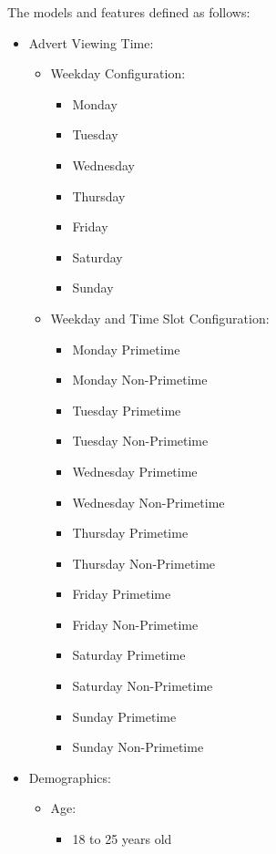 \documentclass[review]{elsarticle}
\begin{document}
The models and features defined as follows:

\begin{itemize}
    \item{Advert Viewing Time:}
    \begin{itemize}
        \item Weekday Configuration:
        \begin{itemize}
            \item Monday
            \item Tuesday
            \item Wednesday
            \item Thursday
            \item Friday
            \item Saturday
            \item Sunday
        \end{itemize}
        \item Weekday and Time Slot Configuration:
        \begin{itemize}
            \item Monday Primetime
            \item Monday Non-Primetime
            \item Tuesday Primetime
            \item Tuesday Non-Primetime
            \item Wednesday Primetime
            \item Wednesday Non-Primetime
            \item Thursday Primetime
            \item Thursday Non-Primetime
            \item Friday Primetime
            \item Friday Non-Primetime
            \item Saturday Primetime
            \item Saturday Non-Primetime
            \item Sunday Primetime
            \item Sunday Non-Primetime
        \end{itemize}
    \end{itemize}
    \item{Demographics:}
    \begin{itemize}
        \item Age:
        \begin{itemize}
            \item 18 to 25 years old

\end{itemize}
\end{itemize}
\end{itemize}
\end{document}
